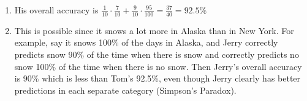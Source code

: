 \begin{enumerate}
\begin{enumerate}
        \item His overall accuracy is $\frac{1}{10} \cdot \frac{7}{10} + \frac{9}{10} \cdot \frac{95}{100} = \frac{37}{40} = 92.5\%$
        
        \item This is possible since it snows a lot more in Alaska than in New York. For example, say it snows 100\% of the days in Alaska, and Jerry correctly predicts snow 90\% of the time when there is snow and correctly predicts no snow 100\% of the time when there is no snow. Then Jerry's overall accuracy is 90\% which is less than Tom's 92.5\%, even though Jerry clearly has better predictions in each separate category (Simpson's Paradox).
    \end{enumerate}
\end{enumerate}